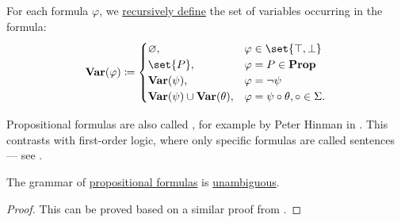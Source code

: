 \begin{definition}
\begin{thmenum}
     For each formula \( \varphi \), we \hyperref[rem:evaluation]{recursively define} the set of variables occurring in the formula:
    \begin{equation}\label{eq:def:propositional_syntax/varables}
      \boldop{Var}(\varphi) \coloneqq \begin{cases}
        \varnothing,                                  &\varphi \in \set{ \top, \bot } \\
        \set{ P },                                    &\varphi = P \in \boldop{Prop} \\
        \boldop{Var}(\psi),                           &\varphi = \neg \psi \\
        \boldop{Var}(\psi) \cup \boldop{Var}(\theta), &\varphi = \psi \bincirc \theta, \bincirc \in \Sigma.
      \end{cases}
    \end{equation}
  \end{thmenum}
\end{definition}
\begin{comments}
  \item Propositional formulas are also called , for example by Peter Hinman in . This contrasts with first-order logic, where only specific formulas are called sentences --- see .
\end{comments}

\begin{proposition}\label{thm:propositional_formulas_are_unambiguous}
  The grammar of \hyperref[def:propositional_syntax/formula]{propositional formulas} is \hyperref[def:grammar_ambiguity]{unambiguous}.
\end{proposition}
\begin{proof}
  This can be proved based on a similar proof from .
\end{proof}

